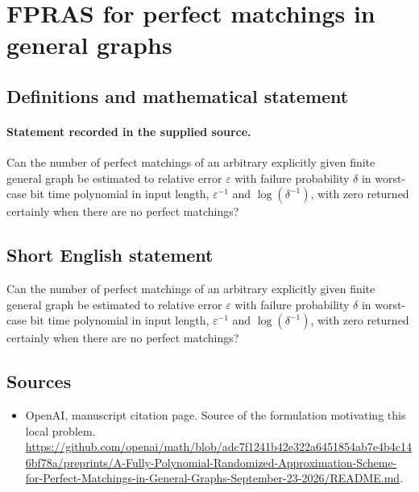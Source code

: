\documentclass[11pt]{article}
\begin{document}
\section*{FPRAS for perfect matchings in general graphs}\label{30007458}
\subsection{Definitions and mathematical statement}
\paragraph{Statement recorded in the supplied source.}
Can the number of perfect matchings of an arbitrary explicitly given finite general graph be estimated to relative error $\varepsilon $ with failure probability $\delta $ in worst-case bit time polynomial in input length, $\varepsilon ^{-1}$ and $\log (\delta ^{-1})$, with zero returned certainly when there are no perfect matchings?
\subsection{Short English statement}
Can the number of perfect matchings of an arbitrary explicitly given finite general graph be estimated to relative error $\varepsilon $ with failure probability $\delta $ in worst-case bit time polynomial in input length, $\varepsilon ^{-1}$ and $\log (\delta ^{-1})$, with zero returned certainly when there are no perfect matchings?
\subsection{Sources}
\begin{itemize}
\item[S1] OpenAI, manuscript citation page. Source of the formulation motivating this local problem.
\url{https://github.com/openai/math/blob/adc7f1241b42e322a6451854ab7e4b4c146bf78a/preprints/A-Fully-Polynomial-Randomized-Approximation-Scheme-for-Perfect-Matchings-in-General-Graphs-September-23-2026/README.md}.
\end{itemize}
\end{document}
